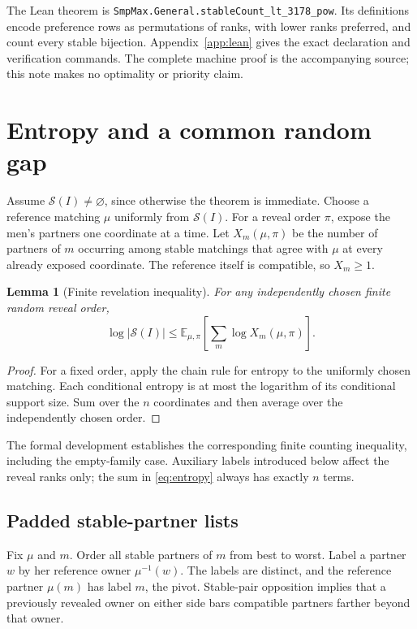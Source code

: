 \documentclass[11pt,letterpaper]{article}
\newtheorem{lemma}{Lemma}
\theoremstyle{remark}
\newcommand{\E}{\mathbb{E}}
\newcommand{\cS}{\mathcal{S}}
\newcommand{\code}[1]{\texttt{#1}}
\numberwithin{equation}{section}
\begin{document}
The Lean theorem is \code{SmpMax.General.stableCount\_lt\_3178\_pow}.
Its definitions encode preference rows as permutations of ranks, with
lower ranks preferred, and count every stable bijection. Appendix~\ref{app:lean}
gives the exact declaration and verification commands. The complete
machine proof is the accompanying source; this note makes no optimality
or priority claim.

\section{Entropy and a common random gap}
\label{sec:gap}

Assume \(\cS(I)\ne\varnothing\), since otherwise the theorem is
immediate. Choose a reference matching \(\mu\) uniformly from
\(\cS(I)\). For a reveal order \(\pi\), expose the men's partners one
coordinate at a time. Let \(X_m(\mu,\pi)\) be the number of partners
of \(m\) occurring among stable matchings that agree with \(\mu\) at
every already exposed coordinate. The reference itself is compatible,
so \(X_m\ge1\).

\begin{lemma}[Finite revelation inequality]\label{lem:entropy}
For any independently chosen finite random reveal order,
\begin{equation}\label{eq:entropy}
  \log |\cS(I)|
  \le \E_{\mu,\pi}\!\left[\sum_m \log X_m(\mu,\pi)\right].
\end{equation}
\end{lemma}

\begin{proof}
For a fixed order, apply the chain rule for entropy to the uniformly
chosen matching. Each conditional entropy is at most the logarithm of
its conditional support size. Sum over the \(n\) coordinates and then
average over the independently chosen order.
\end{proof}

The formal development establishes the corresponding finite counting
inequality, including the empty-family case. Auxiliary labels introduced
below affect the reveal ranks only; the sum in \eqref{eq:entropy}
always has exactly \(n\) terms.

\subsection{Padded stable-partner lists}

Fix \(\mu\) and \(m\). Order all stable partners of \(m\) from best
to worst. Label a partner \(w\) by her reference owner \(\mu^{-1}(w)\).
The labels are distinct, and the reference partner \(\mu(m)\) has label
\(m\), the pivot. Stable-pair opposition implies that a previously
revealed owner on either side bars compatible partners farther beyond
that owner.
\end{document}
